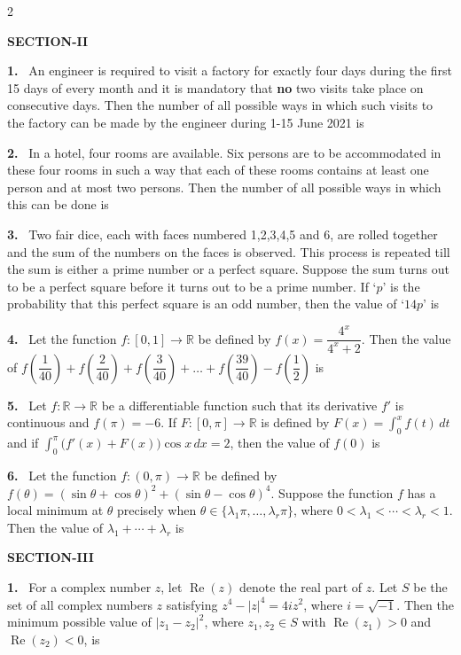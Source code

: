 \documentclass[10pt]{extarticle}
\newcommand{\sect}[1]{\par\smallskip\noindent\textbf{#1}\par}
\newcommand{\qn}[1]{\par\smallskip\noindent\textbf{#1.}~}
\begin{document}
\begin{multicols}{2}
\sect{SECTION-II}
\qn{1} An engineer is required to visit a factory for exactly four days during the first 15 days of every month and it is mandatory that \textbf{no} two visits take place on consecutive days. Then the number of all possible ways in which such visits to the factory can be made by the engineer during 1-15 June 2021 is \underline{\hspace{1cm}}

\qn{2} In a hotel, four rooms are available. Six persons are to be accommodated in these four rooms in such a way that each of these rooms contains at least one person and at most two persons. Then the number of all possible ways in which this can be done is \underline{\hspace{1cm}}

\qn{3} Two fair dice, each with faces numbered 1,2,3,4,5 and 6, are rolled together and the sum of the numbers on the faces is observed. This process is repeated till the sum is either a prime number or a perfect square. Suppose the sum turns out to be a perfect square before it turns out to be a prime number. If `$p$' is the probability that this perfect square is an odd number, then the value of `$14p$' is \underline{\hspace{1cm}}

\qn{4} Let the function $f:[0,1]\to\mathbb R$ be defined by $f(x)=\dfrac{4^x}{4^x+2}$. Then the value of $f\!\left(\dfrac1{40}\right)+f\!\left(\dfrac2{40}\right)+f\!\left(\dfrac3{40}\right)+\ldots+f\!\left(\dfrac{39}{40}\right)-f\!\left(\dfrac12\right)$ is \underline{\hspace{1cm}}

\qn{5} Let $f:\mathbb R\to\mathbb R$ be a differentiable function such that its derivative $f'$ is continuous and $f(\pi)=-6$. If $F:[0,\pi]\to\mathbb R$ is defined by $F(x)=\displaystyle\int_0^xf(t)\,dt$ and if $\displaystyle\int_0^\pi\big(f'(x)+F(x)\big)\cos x\,dx=2$, then the value of $f(0)$ is \underline{\hspace{1cm}}

\qn{6} Let the function $f:(0,\pi)\to\mathbb R$ be defined by $f(\theta)=(\sin\theta+\cos\theta)^2+(\sin\theta-\cos\theta)^4$. Suppose the function $f$ has a local minimum at $\theta$ precisely when $\theta\in\{\lambda_1\pi,\ldots,\lambda_r\pi\}$, where $0<\lambda_1<\cdots<\lambda_r<1$. Then the value of $\lambda_1+\cdots+\lambda_r$ is \underline{\hspace{1cm}}

\sect{SECTION-III}
\qn{1} For a complex number $z$, let $\operatorname{Re}(z)$ denote the real part of $z$. Let $S$ be the set of all complex numbers $z$ satisfying $z^4-|z|^4=4iz^2$, where $i=\sqrt{-1}$. Then the minimum possible value of $|z_1-z_2|^2$, where $z_1,z_2\in S$ with $\operatorname{Re}(z_1)>0$ and $\operatorname{Re}(z_2)<0$, is \underline{\hspace{1cm}}


\end{multicols}
\end{document}
